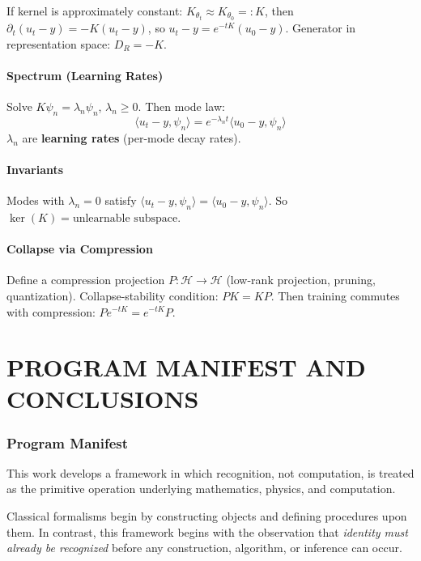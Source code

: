 \documentclass[12pt, oneside]{article}
\begin{document}
If kernel is approximately constant: $K_{\theta_t} \approx K_{\theta_0} =: K$, then $\partial_t (u_t - y) = -K(u_t - y)$, so $u_t - y = e^{-tK}(u_0 - y)$. Generator in representation space: $D_R = -K$.

\subsection{Spectrum (Learning Rates)}

Solve $K \psi_n = \lambda_n \psi_n$, $\lambda_n \geq 0$. Then mode law:
\begin{equation}
\langle u_t - y, \psi_n \rangle = e^{-\lambda_n t} \langle u_0 - y, \psi_n \rangle
\end{equation}
$\lambda_n$ are \textbf{learning rates} (per-mode decay rates).

\subsection{Invariants}

Modes with $\lambda_n = 0$ satisfy $\langle u_t - y, \psi_n \rangle = \langle u_0 - y, \psi_n \rangle$. So $\ker(K) = \text{unlearnable subspace}$.

\subsection{Collapse via Compression}

Define a compression projection $P: \mathcal{H} \rightarrow \mathcal{H}$ (low-rank projection, pruning, quantization). Collapse-stability condition: $PK = KP$. Then training commutes with compression: $Pe^{-tK} = e^{-tK}P$.

\newpage

\part{PROGRAM MANIFEST AND CONCLUSIONS}

\section{Program Manifest}

This work develops a framework in which recognition, not computation, is treated as the primitive operation underlying mathematics, physics, and computation.

Classical formalisms begin by constructing objects and defining procedures upon them. In contrast, this framework begins with the observation that \emph{identity must already be recognized} before any construction, algorithm, or inference can occur.
\end{document}
